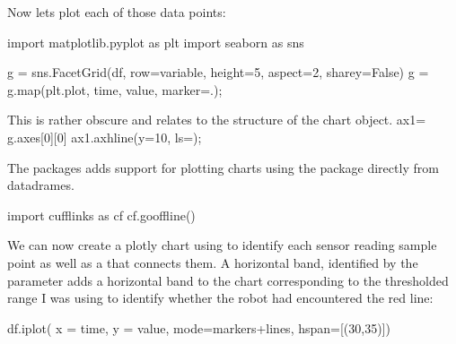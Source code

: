 \documentclass[letterpaper,10pt,english]{sphinxmanual}
\begin{document}
Now lets plot each of those data points:

{
\begin{sphinxVerbatim}[commandchars=\\\{\}]
\llap{\color{nbsphinxin}[ ]:\,\hspace{\fboxrule}\hspace{\fboxsep}}import matplotlib.pyplot as plt
import seaborn as sns

g = sns.FacetGrid(df, row=\PYGZdq{}variable\PYGZdq{},
                  height=5, aspect=2, sharey=False)
g = g.map(plt.plot, \PYGZdq{}time\PYGZdq{}, \PYGZdq{}value\PYGZdq{}, marker=\PYGZdq{}.\PYGZdq{});

\PYGZsh{} This is rather obscure and relates to the structure
\PYGZsh{} of the chart object.
ax1= g.axes[0][0]
ax1.axhline(y=10, ls=\PYGZsq{}\PYGZhy{}\PYGZhy{}\PYGZsq{});
\end{sphinxVerbatim}
}

The  packages adds support for plotting charts using the  package directly from  datadrames.

{
\begin{sphinxVerbatim}[commandchars=\\\{\}]
\llap{\color{nbsphinxin}[ ]:\,\hspace{\fboxrule}\hspace{\fboxsep}}import cufflinks as cf
cf.go\PYGZus{}offline()
\end{sphinxVerbatim}
}

We can now create a plotly chart using  to identify each sensor reading sample point as well as a  that connects them. A horizontal band, identified by the  parameter adds a horizontal band to the chart corresponding to the thresholded range I was using to identify whether the robot had encountered the red line:

{
\begin{sphinxVerbatim}[commandchars=\\\{\}]
\llap{\color{nbsphinxin}[ ]:\,\hspace{\fboxrule}\hspace{\fboxsep}}df.iplot( x = \PYGZsq{}time\PYGZsq{}, y = \PYGZsq{}value\PYGZsq{},
         mode=\PYGZsq{}markers+lines\PYGZsq{}, hspan=[(30,35)])
\end{sphinxVerbatim}
}
\end{document}
